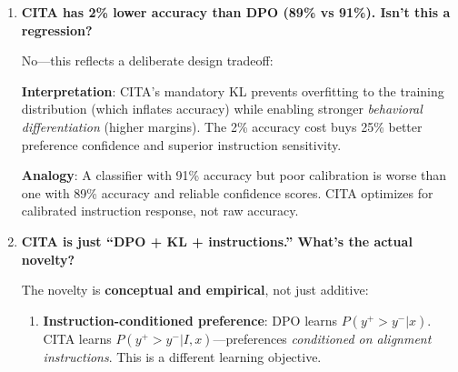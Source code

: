 \begin{enumerate}[label=\textbf{Q\arabic*.}, leftmargin=*, itemsep=8pt]
\vspace{4mm}

\item \textbf{CITA has 2\% lower accuracy than DPO (89\% vs 91\%). Isn't this a regression?}

 No---this reflects a deliberate design tradeoff:

\begin{table}[ht!]
\centering
\normalsize
\renewcommand{\arraystretch}{1.2}
\caption{Accuracy vs reward margin tradeoff between DPO and CITA.}
\label{tab:faq_accuracy_tradeoff}
\end{table}

\textbf{Interpretation}: CITA's mandatory KL prevents overfitting to the training distribution (which inflates accuracy) while enabling stronger \textit{behavioral differentiation} (higher margins). The 2\% accuracy cost buys 25\% better preference confidence and superior instruction sensitivity.

\textbf{Analogy}: A classifier with 91\% accuracy but poor calibration is worse than one with 89\% accuracy and reliable confidence scores. CITA optimizes for calibrated instruction response, not raw accuracy.

\vspace{4mm}

\item \textbf{CITA is just ``DPO + KL + instructions.'' What's the actual novelty?}

 The novelty is \textbf{conceptual and empirical}, not just additive:

\begin{enumerate}[leftmargin=*,itemsep=2pt]
    \item \textbf{Instruction-conditioned preference}: DPO learns $P(y^+ > y^- | x)$. CITA learns $P(y^+ > y^- | I, x)$---preferences \textit{conditioned on alignment instructions}. This is a different learning objective.


\end{enumerate}
\end{enumerate}
